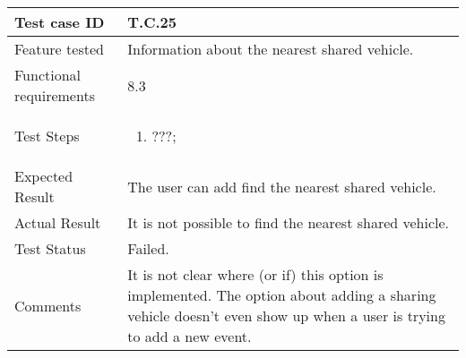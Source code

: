 \begin{table}[H]
	\begin{center}
		\begin{tabular}{ | p{} | p{} | }
		\hline
		Test case ID & T.C.25\\
		\hline
		Feature tested & Information about the nearest shared vehicle.\\
    	\hline
		Functional requirements & 8.3  \\
		\hline
		Test Steps & 
			\begin{enumerate}
				\item ???;
			\end{enumerate} \\
		\hline
		Expected Result & The user can add find the nearest shared vehicle.\\
		\hline
		Actual Result & It is not possible to find the nearest shared vehicle.\\ 
		\hline
		Test Status & \color{Red}Failed.\\ 
		\hline
		Comments & It is not clear where (or if) this option is implemented. The option about adding a sharing vehicle doesn't even show up when a user is trying to add a new event. \\
		\hline
		
		\end{tabular}
	\end{center}
\end{table}

